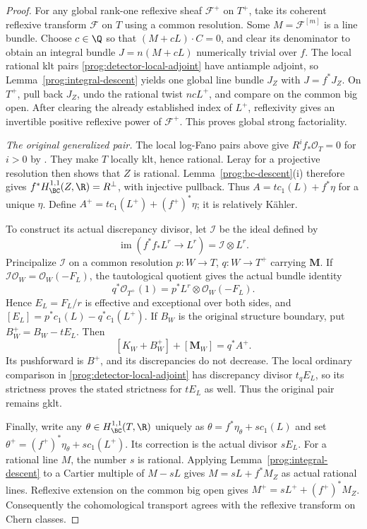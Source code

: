 \begin{proof}
For any global rank-one reflexive sheaf $\mathcal F^+$ on $T^+$,
take its coherent reflexive transform $\mathcal F$ on $T$ using a
common resolution. Some $M=\mathcal F^{[m]}$ is a line bundle.
Choose $c\in\Q$ so that $(M+cL)\cdot C=0$, and clear its denominator
to obtain an integral bundle $J=n(M+cL)$ numerically trivial over $f$.
The local rational klt pairs \eqref{prog:detector-local-adjoint} have
antiample adjoint, so Lemma~\ref{prog:integral-descent} yields
one global line bundle $J_Z$ with $J=f^*J_Z$.
On $T^+$, pull back $J_Z$, undo the rational twist $ncL^+$, and compare
on the common big open. After clearing the already established index
of $L^+$, reflexivity gives an invertible positive reflexive power of
$\mathcal F^+$. This proves global strong factoriality.

\smallskip\noindent
\emph{The original generalized pair.}
The local log-Fano pairs above give $R^if_*\mathcal O_T=0$ for $i>0$
by \cite[Theorem~5.2]{FujinoAnalyticBCHM}. They make $T$ locally klt, hence rational.
Leray for a projective resolution then shows that $Z$ is rational.
Lemma~\ref{prog:bc-descent}(i) therefore gives
$f^*H^{1,1}_{\BC}(Z,\R)=R^\perp$, with injective pullback. Thus $A=t c_1(L)+f^*\eta$ for a unique $\eta$.
Define $A^+=t c_1(L^+)+(f^+)^*\eta$; it is relatively K\"ahler.

To construct its actual discrepancy divisor, let $\mathcal I$ be the
ideal defined by
\[
 \operatorname{im}(f^*f_*L^r\longrightarrow L^r)
   =\mathcal I\otimes L^r.
\]
Principalize $\mathcal I$ on a common resolution $p:W\to T$,
$q:W\to T^+$ carrying $\mathbf M$. If
$\mathcal I\mathcal O_W=\mathcal O_W(-F_L)$, the tautological quotient
gives the actual bundle identity
\[
 q^*\mathcal O_{T^+}(1)=p^*L^r\otimes\mathcal O_W(-F_L).
\]
Hence $E_L=F_L/r$ is effective and exceptional over both sides, and
$[E_L]=p^*c_1(L)-q^*c_1(L^+)$. If $B_W$ is the original structure
boundary, put $B_W^+=B_W-tE_L$. Then
\[
 [K_W+B_W^+]+[\mathbf M_W]=q^*A^+.
\]
Its pushforward is $B^+$, and its discrepancies do not decrease.
The local ordinary comparison in \eqref{prog:detector-local-adjoint}
has discrepancy divisor $t_qE_L$, so its strictness proves the stated
strictness for $tE_L$ as well. Thus the original pair remains gklt.

Finally, write any $\theta\in H^{1,1}_{\BC}(T,\R)$ uniquely as
$\theta=f^*\eta_\theta+s c_1(L)$ and set
$\theta^+=(f^+)^*\eta_\theta+s c_1(L^+)$. Its correction is the actual
divisor $sE_L$. For a rational line $M$, the number $s$ is rational. Applying
Lemma~\ref{prog:integral-descent} to a Cartier multiple of $M-sL$
gives $M=sL+f^*M_Z$ as actual rational lines. Reflexive extension
on the common big open gives $M^+=sL^++(f^+)^*M_Z$.
Consequently the cohomological transport agrees with the reflexive
transform on Chern classes.
\end{proof}


